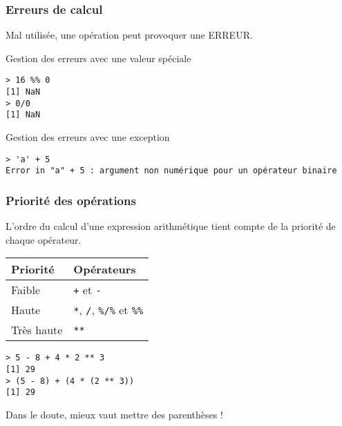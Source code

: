 \documentclass[10pt]{beamer}
\begin{document}
\begin{frame}[fragile]
  \frametitle{Erreurs de calcul}
  Mal utilisée, une opération peut provoquer une ERREUR.

  \begin{block}{Gestion des erreurs avec une valeur spéciale}
  \begin{lstlisting}[style=block]
> 16 %% 0
[1] NaN
> 0/0
[1] NaN
\end{lstlisting}
\end{block}


\begin{block}{Gestion des erreurs avec une exception}
\begin{lstlisting}[style=block]
> 'a' + 5
Error in "a" + 5 : argument non numérique pour un opérateur binaire
\end{lstlisting}
\end{block}

\end{frame}


\begin{frame}[fragile]
  \frametitle{Priorité des opérations}
  L'ordre du calcul d'une expression arithmétique tient compte de la priorité de chaque opérateur.

  \begin{table}
    \begin{tabular}{ll}
      \toprule
      Priorité   & Opérateurs                                              \\
      \midrule
      Faible     & \texttt{+} et \texttt{-}                                \\
      Haute      & \texttt{*}, \texttt{/}, \texttt{\%/\%} et \texttt{\%\%} \\
      Très haute & \texttt{**}                                             \\
      \bottomrule
    \end{tabular}
  \end{table}
\begin{lstlisting}
> 5 - 8 + 4 * 2 ** 3
[1] 29
> (5 - 8) + (4 * (2 ** 3))
[1] 29
\end{lstlisting}
Dans le doute, \alert{mieux vaut mettre des parenthèses} !
\end{frame}
\end{document}
